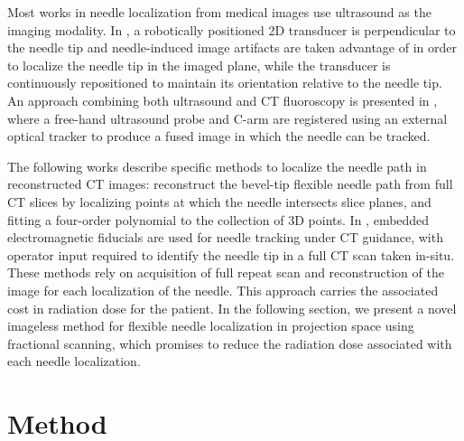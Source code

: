 \documentclass[letterpaper, 11 pt, conference]{ieeeconf}  %
\begin{document}
Most works in needle localization from medical images use ultrasound as the imaging modality. In \cite{vrooijink2013real}, a robotically positioned 2D transducer is perpendicular to the needle tip and needle-induced image artifacts are taken advantage of in order to localize the needle tip in the imaged plane, while the transducer is continuously repositioned to maintain its orientation relative to the needle tip. An approach combining both ultrasound and CT fluoroscopy is presented in \cite{marinetto2017integration}, where a free-hand ultrasound probe and C-arm are registered using an external optical tracker to produce a fused image in which the needle can be tracked.

The following works describe specific methods to localize the needle path in reconstructed CT images:
\cite{huo2015shape} reconstruct the bevel-tip flexible needle path from full CT slices by localizing points at which the needle intersects slice planes, and fitting a four-order polynomial to the collection of 3D points.
In \cite{yaniv2010needle}, embedded electromagnetic fiducials are used for needle tracking under CT guidance, with operator input required to identify the needle tip in a full CT scan taken in-situ. These methods rely on acquisition of full repeat scan and reconstruction of the image for each localization of the needle. This approach carries the associated cost in radiation dose for the patient. In the following section, we present a novel imageless method for flexible needle localization in projection space using fractional scanning, which promises to reduce the radiation dose associated with each needle localization.

\section{Method}
\end{document}
